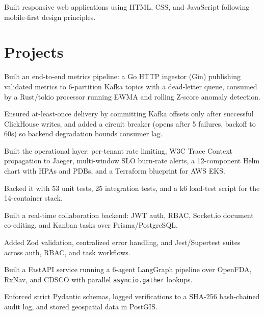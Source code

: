\documentclass[a4paper,10pt]{article}
\begin{document}
\begin{points}
  \item Built responsive web applications using HTML, CSS, and JavaScript following mobile-first design principles.
\end{points}

\section{Projects}

\begin{points}
  \item Built an end-to-end metrics pipeline: a Go HTTP ingestor (Gin) publishing validated metrics to 6-partition Kafka topics with a dead-letter queue, consumed by a Rust/tokio processor running EWMA and rolling Z-score anomaly detection.
  \item Ensured at-least-once delivery by committing Kafka offsets only after successful ClickHouse writes, and added a circuit breaker (opens after 5 failures, backoff to 60s) so backend degradation bounds consumer lag.
  \item Built the operational layer: per-tenant rate limiting, W3C Trace Context propagation to Jaeger, multi-window SLO burn-rate alerts, a 12-component Helm chart with HPAs and PDBs, and a Terraform blueprint for AWS EKS.
  \item Backed it with 53 unit tests, 25 integration tests, and a k6 load-test script for the 14-container stack.
\end{points}
\gap

\begin{points}
  \item Built a real-time collaboration backend: JWT auth, RBAC, Socket.io document co-editing, and Kanban tasks over Prisma/PostgreSQL.
  \item Added Zod validation, centralized error handling, and Jest/Supertest suites across auth, RBAC, and task workflows.
\end{points}
\gap

\begin{points}
  \item Built a FastAPI service running a 6-agent LangGraph pipeline over OpenFDA, RxNav, and CDSCO with parallel \texttt{asyncio.gather} lookups.
  \item Enforced strict Pydantic schemas, logged verifications to a SHA-256 hash-chained audit log, and stored geospatial data in PostGIS.
\end{points}
\gap
\end{document}
